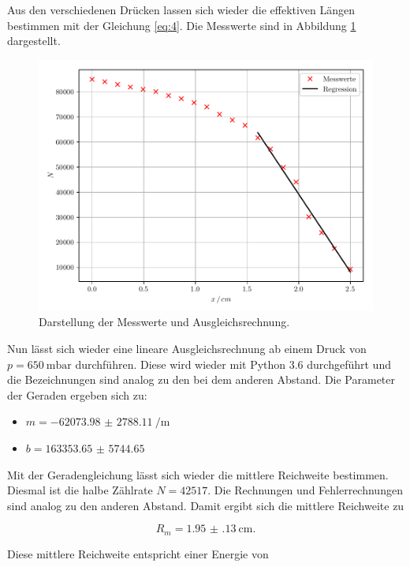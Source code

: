 Aus den verschiedenen Drücken lassen sich wieder die effektiven Längen bestimmen mit
der Gleichung \ref{eq:4}. Die Messwerte sind in Abbildung \ref{abb:4} dargestellt.

\begin{figure}[H]
  \centering
  \includegraphics{plot3.pdf}
  \caption{Darstellung der Messwerte und Ausgleichsrechnung.}
  \label{abb:4}
\end{figure}

Nun lässt sich wieder eine lineare Ausgleichsrechnung ab einem Druck von $p = \SI{650}{\milli\bar}$
durchführen. Diese wird wieder mit Python 3.6 durchgeführt und die Bezeichnungen sind analog zu
den bei dem anderen Abstand. Die Parameter der Geraden ergeben sich zu:

\begin{itemize}
  \item $m = \SI{-62073.98(278811)}{\per\meter}$
  \item $b = \num{163353.65(574465)}$
\end{itemize}

Mit der Geradengleichung lässt sich wieder die mittlere Reichweite bestimmen.
Diesmal ist die halbe Zählrate $N = 42517$.
Die Rechnungen und Fehlerrechnungen sind analog zu den anderen Abstand. Damit ergibt
sich die mittlere Reichweite zu

\begin{equation*}
  R_m = \SI{1.95(13)}{\centi\meter}.
\end{equation*}

Diese mittlere Reichweite entspricht einer Energie von

